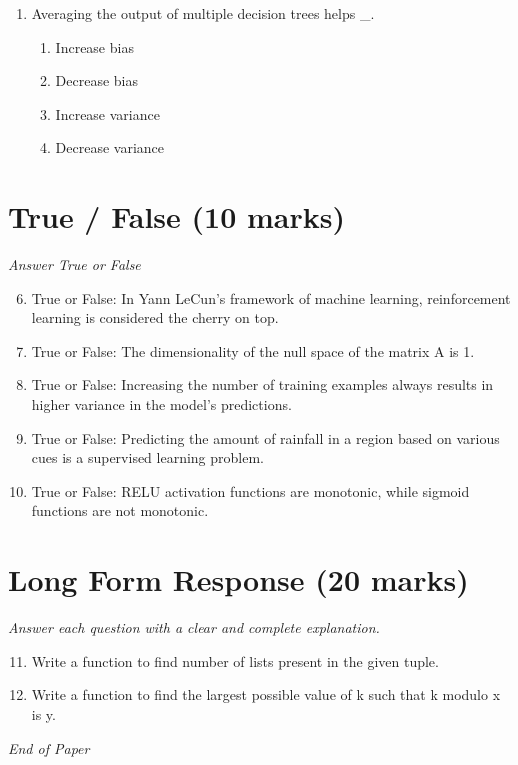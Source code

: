 \documentclass[12pt]{article}
\begin{document}
\begin{enumerate}[label=\arabic*.]
\begin{enumerate}[label=(\alph*)]
    \item they have high variance
    \item they are not consistent estimators
    \item None of the above
\end{enumerate}
\item Averaging the output of multiple decision trees helps \_.
\begin{enumerate}[label=(\alph*)]
    \item Increase bias
    \item Decrease bias
    \item Increase variance
    \item Decrease variance
\end{enumerate}
\end{enumerate}

\section*{True / False (10 marks)}
\textit{Answer True or False}
\begin{enumerate}[label=\arabic*.]
\setcounter{enumi}{5}
\item True or False: In Yann LeCun's framework of machine learning, reinforcement learning is considered the cherry on top.
\item True or False: The dimensionality of the null space of the matrix A is 1.
\item True or False: Increasing the number of training examples always results in higher variance in the model's predictions.
\item True or False: Predicting the amount of rainfall in a region based on various cues is a supervised learning problem.
\item True or False: RELU activation functions are monotonic, while sigmoid functions are not monotonic.
\end{enumerate}

\section*{Long Form Response (20 marks)}
\textit{Answer each question with a clear and complete explanation.}
\begin{enumerate}[label=\arabic*.]
\setcounter{enumi}{10}
\item Write a function to find number of lists present in the given tuple.
\item Write a function to find the largest possible value of k such that k modulo x is y.
\end{enumerate}

\vfill
\noindent\textit{End of Paper}
\end{document}
